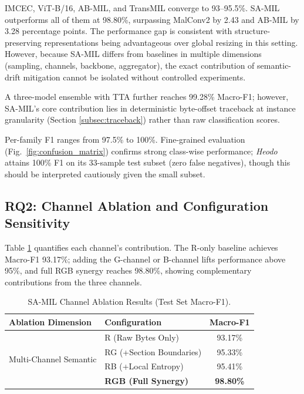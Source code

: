 \documentclass[runningheads]{llncs}
\begin{document}
IMCEC, ViT-B/16, AB-MIL, and TransMIL converge to 93--95.5\%. SA-MIL outperforms all of them at 98.80\%, surpassing MalConv2 by 2.43 and AB-MIL by 3.28 percentage points. The performance gap is consistent with structure-preserving representations being advantageous over global resizing in this setting. However, because SA-MIL differs from baselines in multiple dimensions (sampling, channels, backbone, aggregator), the exact contribution of semantic-drift mitigation cannot be isolated without controlled experiments.

A three-model ensemble with TTA further reaches 99.28\% Macro-F1; however, SA-MIL's core contribution lies in deterministic byte-offset traceback at instance granularity (Section \ref{subsec:traceback}) rather than raw classification scores.

Per-family F1 ranges from 97.5\% to 100\%. Fine-grained evaluation (Fig.~\ref{fig:confusion_matrix}) confirms strong class-wise performance; \textit{Heodo} attains 100\% F1 on its 33-sample test subset (zero false negatives), though this should be interpreted cautiously given the small subset.



\subsection{RQ2: Channel Ablation and Configuration Sensitivity}
\label{subsec:ablation}
Table \ref{tab:ablation} quantifies each channel's contribution. The R-only baseline achieves Macro-F1 93.17\%; adding the G-channel or B-channel lifts performance above 95\%, and full RGB synergy reaches 98.80\%, showing complementary contributions from the three channels. 

\begin{table}[htbp]
\centering
\caption{SA-MIL Channel Ablation Results (Test Set Macro-F1).}
\label{tab:ablation}
\begin{tabular}{llc}
\toprule
\textbf{Ablation Dimension} & \textbf{Configuration} & \textbf{Macro-F1} \\
\midrule
\multirow{4}{*}{Multi-Channel Semantic} 
& R (Raw Bytes Only) & 93.17\% \\
& RG (+Section Boundaries) & 95.33\% \\
& RB (+Local Entropy) & 95.41\% \\
& \textbf{RGB (Full Synergy)} & \textbf{98.80\%} \\
\bottomrule
\end{tabular}
\end{table}
\end{document}
